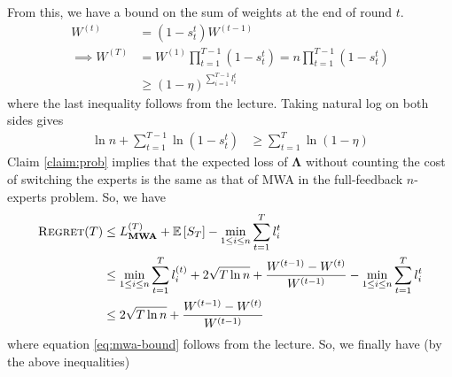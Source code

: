 \documentclass[11pt]{article}
\begin{document}
From this, we have a bound on the sum of weights at the end of round $t$.
\begin{align}
    W^{(t)} &= (1 - s_{t}^{t}) W^{(t-1)} \\
    \implies W^{(T)} &= W^{(1)} \prod_{t=1}^{T-1} (1 - s_{t}^{t}) = n \prod_{t=1}^{T-1} (1 - s_{t}^{t}) \\
    &\geq (1 - \eta)^{\sum_{i=1}^{T-1}l_{i}^{t}}
\end{align}
where the last inequality follows from the lecture. Taking natural log on both sides gives
\begin{align}
    \ln{n} + \sum_{t=1}^{T-1} \ln{(1 - s_{t}^{t})} &\geq \sum_{t=1}^{T} \ln{(1 - \eta)}
\end{align}
Claim \ref{claim:prob} implies that the expected loss of $\mathbf{\Lambda}$ without counting the cost of
switching the experts is the same as that of MWA in the full-feedback $n$-experts problem. So, we have
\begin{align}
    \textsc{Regret}(T) &\leq L_{\mathbf{\mathbf{MWA}}}^{(T)} + \mathbb{E}\left[ S_{T} \right] - \min_{1 \leq i \leq n} \sum_{t=1}^{T} l_{i}^{t} \\
    \label{eq:mwa-bound}
    &\leq \min_{1 \leq i \leq n} \sum_{t=1}^{T} l_{i}^{(t)} + 2 \sqrt{T \ln{n}} + \frac{W^{(t-1)} - W^{(t)}}{W^{(t-1)}} - \min_{1 \leq i \leq n} \sum_{t=1}^{T} l_{i}^{t} \\
    &\leq 2 \sqrt{T \ln{n}} + \frac{W^{(t-1)} - W^{(t)}}{W^{(t-1)}}
\end{align}
where equation \eqref{eq:mwa-bound} follows from the lecture. So, we finally have (by the above inequalities)
\begin{align}
\end{align}
\end{document}
